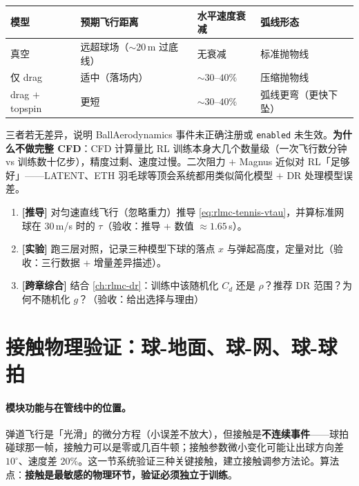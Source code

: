 \begin{center}
\small
\begin{tabular}{@{}llll@{}}
\toprule
模型 & 预期飞行距离 & 水平速度衰减 & 弧线形态 \\
\midrule
真空 & 远超球场（$\sim20$\,m 过底线） & 无衰减 & 标准抛物线 \\
仅 drag & 适中（落场内） & $\sim30$--$40\%$ & 压缩抛物线 \\
drag $+$ topspin & 更短 & $\sim30$--$40\%$ & 弧线更弯（更快下坠） \\
\bottomrule
\end{tabular}
\end{center}

三者若无差异，说明 BallAerodynamics 事件未正确注册或 \verb|enabled| 未生效。\textbf{为什么不做完整 CFD}：CFD 计算量比 RL 训练本身大几个数量级（一次飞行数分钟 vs 训练数十亿步），精度过剩、速度过慢。二次阻力 $+$ Magnus 近似对 RL「足够好」——LATENT、ETH 羽毛球等顶会系统都用类似简化模型 $+$ DR 处理模型误差。

\begin{practice}[本节动手任务]
\begin{enumerate}
  \item \textbf{[推导]} 对匀速直线飞行（忽略重力）推导 \eqref{eq:rlmc-tennis-vtau}，并算标准网球在 $30$\,m/s 时的 $\tau$（验收：推导 + 数值 $\approx1.65$\,s）。
  \item \textbf{[实验]} 跑三层对照，记录三种模型下球的落点 $x$ 与弹起高度，定量对比（验收：三行数据 + 增量差异描述）。
  \item \textbf{[跨章综合]} 结合 \cref{ch:rlmc-dr}：训练中该随机化 $C_d$ 还是 $\rho$？推荐 DR 范围？为何不随机化 $g$？（验收：给出选择与理由）
\end{enumerate}
\end{practice}

\section{接触物理验证：球-地面、球-网、球-球拍}
\label{sec:rlmc-tennis-contact}

\paragraph{模块功能与在管线中的位置。}弹道飞行是「光滑」的微分方程（小误差不放大），但接触是\textbf{不连续事件}——球拍碰球那一帧，接触力可以是零或几百牛顿；接触参数微小变化可能让出球方向差 $10^\circ$、速度差 $20\%$。这一节系统验证三种关键接触，建立接触调参方法论。算法点：\textbf{接触是最敏感的物理环节，验证必须独立于训练}。

